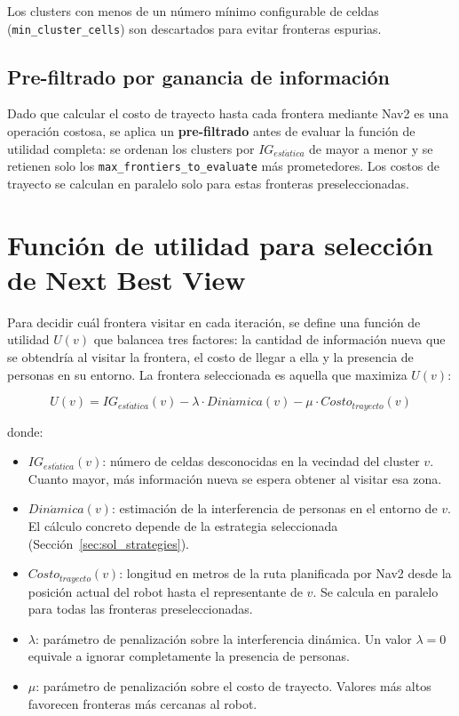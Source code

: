 Los clusters con menos de un número mínimo configurable de celdas
(\texttt{min\_cluster\_cells}) son descartados para evitar fronteras espurias.

\subsection{Pre-filtrado por ganancia de información}

Dado que calcular el costo de trayecto hasta cada frontera mediante Nav2 es
una operación costosa, se aplica un \textbf{pre-filtrado} antes de evaluar la
función de utilidad completa: se ordenan los clusters por $IG_{est\acute{a}tica}$
de mayor a menor y se retienen solo los \texttt{max\_frontiers\_to\_evaluate}
más prometedores. Los costos de trayecto se calculan en paralelo solo para
estas fronteras preseleccionadas.

\section{Función de utilidad para selección de Next Best View}%
\label{sec:sol_utility}

Para decidir cuál frontera visitar en cada iteración, se define una función de
utilidad $U(v)$ que balancea tres factores: la cantidad de información nueva que
se obtendría al visitar la frontera, el costo de llegar a ella y la presencia de
personas en su entorno. La frontera seleccionada es aquella que maximiza $U(v)$:

\begin{equation}
    U(v) = IG_{est\acute{a}tica}(v) - \lambda \cdot Din\acute{a}mica(v) - \mu \cdot Costo_{trayecto}(v)
    \label{eq:utility}
\end{equation}

donde:

\begin{itemize}
    \item $IG_{est\acute{a}tica}(v)$: número de celdas desconocidas en la
          vecindad del cluster $v$. Cuanto mayor, más información nueva se
          espera obtener al visitar esa zona.
    \item $Din\acute{a}mica(v)$: estimación de la interferencia de personas
          en el entorno de $v$. El cálculo concreto depende de la estrategia
          seleccionada (Sección~\ref{sec:sol_strategies}).
    \item $Costo_{trayecto}(v)$: longitud en metros de la ruta planificada
          por Nav2 desde la posición actual del robot hasta el representante
          de $v$. Se calcula en paralelo para todas las fronteras
          preseleccionadas.
    \item $\lambda$: parámetro de penalización sobre la interferencia dinámica.
          Un valor $\lambda = 0$ equivale a ignorar completamente la presencia
          de personas.
    \item $\mu$: parámetro de penalización sobre el costo de trayecto.
          Valores más altos favorecen fronteras más cercanas al robot.
\end{itemize}

